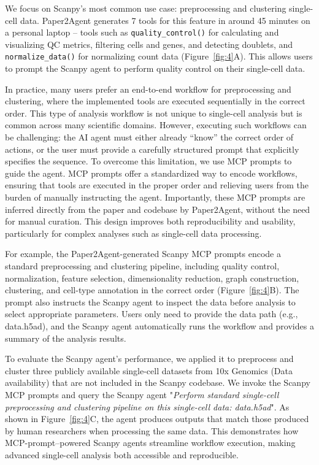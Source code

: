\documentclass[11pt]{article}
\begin{document}
We focus on Scanpy’s most common use case: preprocessing and clustering single-cell data. Paper2Agent generates 7 tools for this feature in around 45 minutes on a personal laptop -- tools such as \texttt{quality\_control()} for calculating and visualizing QC metrics, filtering cells and genes, and detecting doublets, and \texttt{normalize\_data()} for normalizing count data (Figure~\ref{fig:4}A). This allows users to prompt the Scanpy agent to perform quality control on their single-cell data.

In practice, many users prefer an end-to-end workflow for preprocessing and clustering, where the implemented tools are executed sequentially in the correct order. This type of analysis workflow is not unique to single-cell analysis but is common across many scientific domains. However, executing such workflows can be challenging: the AI agent must either already “know” the correct order of actions, or the user must provide a carefully structured prompt that explicitly specifies the sequence. To overcome this limitation, we use MCP prompts to guide the agent. MCP prompts offer a standardized way to encode workflows, ensuring that tools are executed in the proper order and relieving users from the burden of manually instructing the agent. Importantly, these MCP prompts are inferred directly from the paper and codebase by Paper2Agent, without the need for manual curation. This design improves both reproducibility and usability, particularly for complex analyses such as single-cell data processing.

For example, the Paper2Agent-generated Scanpy MCP prompts encode a standard preprocessing and clustering pipeline, including quality control, normalization, feature selection, dimensionality reduction, graph construction, clustering, and cell-type annotation in the correct order (Figure~\ref{fig:4}B). The prompt also instructs the Scanpy agent to inspect the data before analysis to select appropriate parameters. Users only need to provide the data path (e.g., data.h5ad), and the Scanpy agent automatically runs the workflow and provides a summary of the analysis results.

To evaluate the Scanpy agent’s performance, we applied it to preprocess and cluster three publicly available single-cell datasets from 10x Genomics (Data availability) that are not included in the Scanpy codebase. We invoke the Scanpy MCP prompts and query the Scanpy agent "\textit{Perform standard single-cell preprocessing and clustering pipeline on this single-cell data: data.h5ad}". As shown in Figure~\ref{fig:4}C, the agent produces outputs that match those produced by human researchers when processing the same data. This demonstrates how MCP-prompt–powered Scanpy agents streamline workflow execution, making advanced single-cell analysis both accessible and reproducible.
\end{document}
